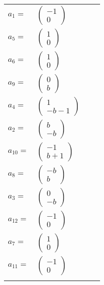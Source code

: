 \documentclass[1p]{elsarticle_modified}
\theoremstyle{definition}
\begin{document}
\begin{tabular}{m{7pt} m{180pt} m{7pt} m{180pt} }
\flushright $a_{1}=$&$\begin{pmatrix}-1\\0\end{pmatrix}$ \\
\flushright $a_{5}=$&$\begin{pmatrix}1\\0\end{pmatrix}$ \\
\flushright $a_{6}=$&$\begin{pmatrix}1\\0\end{pmatrix}$ \\
\flushright $a_{9}=$&$\begin{pmatrix}0\\b\end{pmatrix}$ \\
\flushright $a_{4}=$&$\begin{pmatrix}1\\- b-1\end{pmatrix}$ \\
\flushright $a_{2}=$&$\begin{pmatrix}b\\- b\end{pmatrix}$ \\
\flushright $a_{10}=$&$\begin{pmatrix}-1\\b+1\end{pmatrix}$ \\
\flushright $a_{8}=$&$\begin{pmatrix}- b\\b\end{pmatrix}$ \\
\flushright $a_{3}=$&$\begin{pmatrix}0\\- b\end{pmatrix}$ \\
\flushright $a_{12}=$&$\begin{pmatrix}-1\\0\end{pmatrix}$ \\
\flushright $a_{7}=$&$\begin{pmatrix}1\\0\end{pmatrix}$ \\
\flushright $a_{11}=$&$\begin{pmatrix}-1\\0\end{pmatrix}$\\&\end{tabular}
\end{document}
